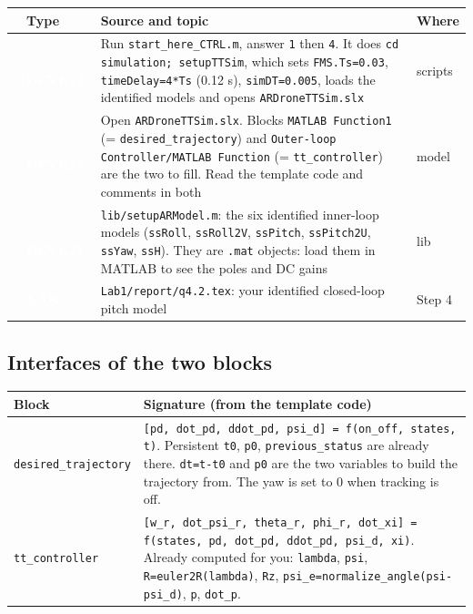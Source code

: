 \documentclass[10pt,a4paper]{article}
\newcommand{\cb}{\raisebox{-0.35ex}{\Large$\square$}}
\newcommand{\srctag}[2]{\colorbox{#1}{\textcolor{white}{\textbf{\scriptsize\,#2\,}}}}
\newcommand{\DEVKIT}{\srctag{devkit}{DEVKIT}}
\newcommand{\LAB}{\srctag{devkit}{LAB}}
\begin{document}
\begin{tabularx}{\textwidth}{@{}C T X l@{}}
\toprule
\cb & Type & Source and topic & Where\\
\midrule
\cb & \DEVKIT & Run \texttt{start\_here\_CTRL.m}, answer \texttt{1} then \texttt{4}. It does \texttt{cd simulation; setupTTSim}, which sets \texttt{FMS.Ts=0.03}, \texttt{timeDelay=4*Ts} (0.12 s), \texttt{simDT=0.005}, loads the identified models and opens \texttt{ARDroneTTSim.slx} & scripts\\
\cb & \DEVKIT & Open \texttt{ARDroneTTSim.slx}. Blocks \texttt{MATLAB Function1} (= \texttt{desired\_trajectory}) and \texttt{Outer-loop Controller/MATLAB Function} (= \texttt{tt\_controller}) are the two to fill. Read the template code and comments in both & model\\
\cb & \DEVKIT & \texttt{lib/setupARModel.m}: the six identified inner-loop models (\texttt{ssRoll}, \texttt{ssRoll2V}, \texttt{ssPitch}, \texttt{ssPitch2U}, \texttt{ssYaw}, \texttt{ssH}). They are \texttt{.mat} objects: load them in MATLAB to see the poles and DC gains & lib\\
\cb & \LAB & \texttt{Lab1/report/q4.2.tex}: your identified closed-loop pitch model & Step 4\\
\bottomrule
\end{tabularx}

\subsection*{Interfaces of the two blocks}

\begin{tabularx}{\textwidth}{@{}l X@{}}
\toprule
Block & Signature (from the template code)\\
\midrule
\texttt{desired\_trajectory} & \texttt{[pd, dot\_pd, ddot\_pd, psi\_d] = f(on\_off, states, t)}. Persistent \texttt{t0}, \texttt{p0}, \texttt{previous\_status} are already there. \texttt{dt=t-t0} and \texttt{p0} are the two variables to build the trajectory from. The yaw is set to 0 when tracking is off.\\
\texttt{tt\_controller} & \texttt{[w\_r, dot\_psi\_r, theta\_r, phi\_r, dot\_xi] = f(states, pd, dot\_pd, ddot\_pd, psi\_d, xi)}. Already computed for you: \texttt{lambda}, \texttt{psi}, \texttt{R=euler2R(lambda)}, \texttt{Rz}, \texttt{psi\_e=normalize\_angle(psi-psi\_d)}, \texttt{p}, \texttt{dot\_p}.\\
\bottomrule
\end{tabularx}
\end{document}
